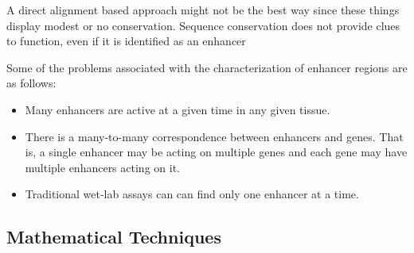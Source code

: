         
        

        
        
        
        A direct alignment based approach might not be the best way since these things display modest or no conservation. Sequence conservation does not provide clues to function, even if it is identified as an enhancer~\cite{pennacchio2013enhancers}
        
         Some of the problems associated with the characterization of enhancer regions are as follows:
        	\begin{itemize}
        		\item Many enhancers are active at a given time in any given tissue. 
        		\item There is a many-to-many correspondence between enhancers and genes. That is, a single enhancer may be acting on multiple genes and each gene may have multiple enhancers acting on it. 
        		\item Traditional wet-lab assays can can find only one enhancer at a time. 
        	\end{itemize}

        \subsection{Mathematical Techniques}

